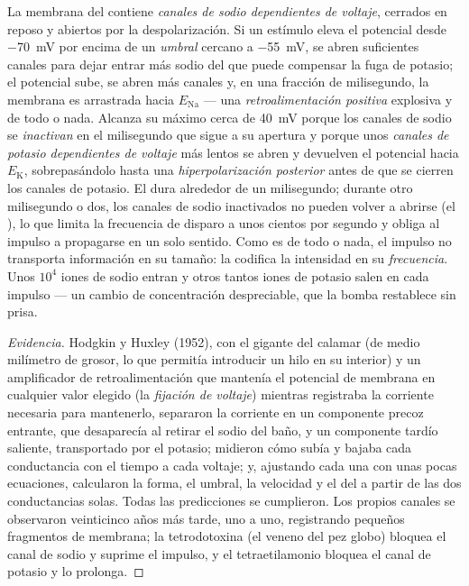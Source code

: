 \begin{proposition}[El impulso]\label{prop:b2:neurons-synapses:ap}
La membrana del  contiene \emph{canales de sodio dependientes de
voltaje}, cerrados en reposo y abiertos por la despolarización. Si un
estímulo eleva el potencial desde \qty{-70}{mV} por encima de un
\emph{umbral} cercano a \qty{-55}{mV}, se abren suficientes canales para
dejar entrar más sodio del que puede compensar la fuga de potasio; el
potencial sube, se abren más canales y, en una fracción de milisegundo,
la membrana es arrastrada hacia
$E_{\mathrm{Na}}$ --- una \emph{retroalimentación positiva} explosiva y
de todo o nada. Alcanza su máximo cerca de \qty{+40}{mV} porque los
canales de sodio se \emph{inactivan} en el milisegundo que sigue a su
apertura y porque unos \emph{canales de potasio dependientes de voltaje}
más lentos se abren y devuelven el potencial hacia $E_{\mathrm K}$,
sobrepasándolo hasta una \emph{hiperpolarización posterior} antes de que
se cierren los canales de potasio. El \emph{} dura
alrededor de un milisegundo; durante otro milisegundo o dos, los canales
de sodio inactivados no pueden volver a abrirse (el \emph{}), lo que limita la frecuencia de disparo a unos cientos por
segundo y obliga al impulso a propagarse en un solo sentido. Como es de
todo o nada, el impulso no transporta información en su tamaño: la
 codifica la intensidad en su \emph{frecuencia}. Unos
$10^{4}$ iones de sodio entran y otros tantos iones de potasio salen en
cada impulso --- un cambio de concentración despreciable, que la bomba
restablece sin prisa.
\end{proposition}
\begin{proof}[Evidencia]
Hodgkin y Huxley (1952), con el  gigante del calamar (de medio
milímetro de grosor, lo que permitía introducir un hilo en su interior) y
un amplificador de retroalimentación que mantenía el potencial de membrana
en cualquier valor elegido (la \emph{fijación de voltaje}) mientras
registraba la corriente necesaria para mantenerlo, separaron la corriente
en un componente precoz entrante, que desaparecía al retirar el sodio del
baño, y un componente tardío saliente, transportado por el potasio;
midieron cómo subía y bajaba cada conductancia con el tiempo a cada
voltaje; y, ajustando cada una con unas pocas ecuaciones, calcularon la
forma, el umbral, la velocidad y el  del  a partir de las dos conductancias solas. Todas las predicciones se
cumplieron. Los propios canales se observaron veinticinco años más tarde,
uno a uno, registrando pequeños fragmentos de membrana; la tetrodotoxina
(el veneno del pez globo) bloquea el canal de sodio y suprime el impulso,
y el tetraetilamonio bloquea el canal de potasio y lo prolonga.
\end{proof}
